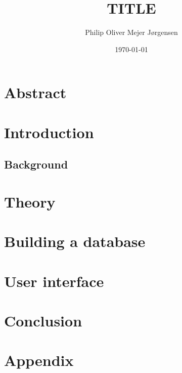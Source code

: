 \documentclass{article}
\title{TITLE}
\author{Philip Oliver Mejer Jørgensen}
\date{\today}
\begin{document}
\maketitle

\newpage

\tableofcontents

\newpage

\section{Abstract}

\section{Introduction}
\subsection{Background}

\section{Theory}


\section{Building a database}


\section{User interface}


\section{Conclusion}

\section{Appendix}
\end{document}
